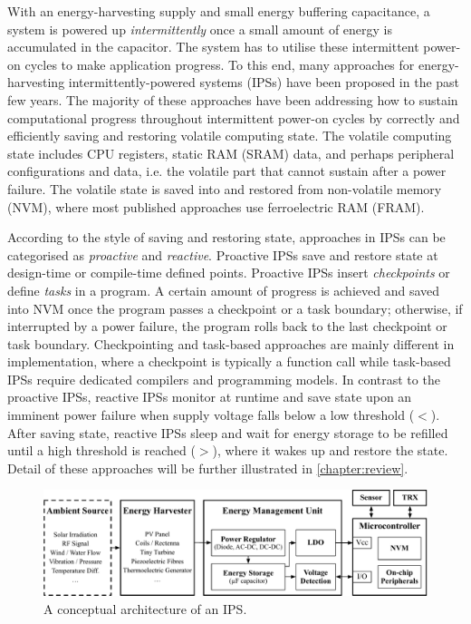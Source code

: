 
\needref
With an energy-harvesting supply and small energy buffering capacitance, a system is powered up \textit{intermittently} once a small amount of energy is accumulated in the capacitor. 
The system has to utilise these intermittent power-on cycles to make application progress. 
To this end, many approaches for energy-harvesting intermittently-powered systems (IPSs) have been proposed in the past few years. 
The majority of these approaches have been addressing how to sustain computational progress throughout intermittent power-on cycles by correctly and efficiently saving and restoring volatile computing state. 
The volatile computing state includes CPU registers, static RAM (SRAM) data, and perhaps peripheral configurations and data, i.e. the volatile part that cannot sustain after a power failure. 
The volatile state is saved into and restored from non-volatile memory (NVM), where most published approaches use ferroelectric RAM (FRAM). 

\needref
According to the style of saving and restoring state, approaches in IPSs can be categorised as \textit{proactive} and \textit{reactive}. 
Proactive IPSs save and restore state at design-time or compile-time defined points. 
Proactive IPSs insert \textit{checkpoints} or define \textit{tasks} in a program. 
A certain amount of progress is achieved and saved into NVM once the program passes a checkpoint or a task boundary; otherwise, if interrupted by a power failure, the program rolls back to the last checkpoint or task boundary. 
Checkpointing and task-based approaches are mainly different in implementation, where a checkpoint is typically a function call while task-based IPSs require dedicated compilers and programming models. 
In contrast to the proactive IPSs, reactive IPSs monitor  at runtime and save state upon an imminent power failure when supply voltage falls below a low threshold ($<$). 
After saving state, reactive IPSs sleep and wait for energy storage to be refilled until a high threshold is reached ($>$), where it wakes up and restore the state. 
Detail of these approaches will be further illustrated in \cref{chapter:review}.

\begin{figure}
  \centering
  \includegraphics[width=\columnwidth]{ch1_intro/figures/IPSarch}
  \caption{A conceptual architecture of an IPS.}
  \label{fig:ips_arch}
\end{figure}

